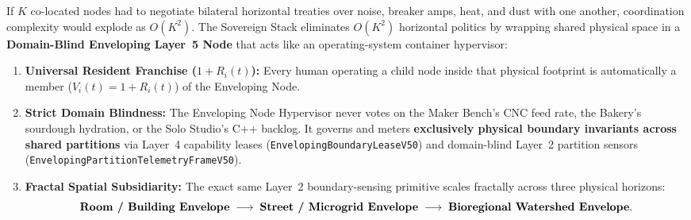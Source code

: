 If $K$ co-located nodes had to negotiate bilateral horizontal treaties over noise, breaker amps, heat, and dust with one another, coordination complexity would explode as $O(K^2)$. The Sovereign Stack eliminates $O(K^2)$ horizontal politics by wrapping shared physical space in a \textbf{Domain-Blind Enveloping Layer~5 Node} that acts like an operating-system container hypervisor:
\begin{enumerate}
    \item \textbf{Universal Resident Franchise ($1 + R_i(t)$):} Every human operating a child node inside that physical footprint is automatically a member ($V_i(t) = 1 + R_i(t)$) of the Enveloping Node.
    \item \textbf{Strict Domain Blindness:} The Enveloping Node Hypervisor never votes on the Maker Bench's CNC feed rate, the Bakery's sourdough hydration, or the Solo Studio's C++ backlog. It governs and meters \textbf{exclusively physical boundary invariants across shared partitions} via Layer~4 capability leases (\texttt{EnvelopingBoundaryLeaseV50}) and domain-blind Layer~2 partition sensors (\texttt{EnvelopingPartitionTelemetryFrameV50}).
    \item \textbf{Fractal Spatial Subsidiarity:} The exact same Layer~2 boundary-sensing primitive scales fractally across three physical horizons:
    \begin{equation}
        \text{\textbf{Room / Building Envelope}} \;\longrightarrow\; \text{\textbf{Street / Microgrid Envelope}} \;\longrightarrow\; \text{\textbf{Bioregional Watershed Envelope}}.
        \label{eq:l2-fractal-envelope-scale}
    \end{equation}
\end{enumerate}

